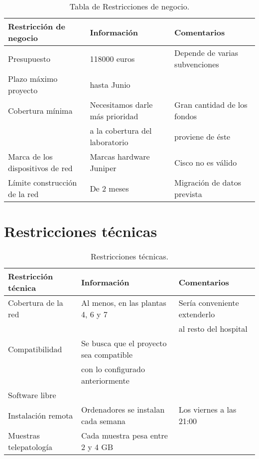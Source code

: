 \begin{table}[H]
	\begin{center}
		\begin{tabular}{|l|l|l|}
			\hline 
			Restricción de negocio & Información & Comentarios \\ 
			\hline \hline
			Presupuesto & 118000 euros & Depende de varias subvenciones \\ \hline
			Plazo máximo proyecto & hasta Junio & \\ \hline
			Cobertura mínima & Necesitamos darle más prioridad  & Gran cantidad de los fondos \\ 
			 & a la cobertura del laboratorio & proviene de éste  \\ \hline
			Marca de los dispositivos de red & Marcas hardware Juniper & Cisco no es válido\\ \hline
			Límite construcción de la red & De 2 meses & Migración de datos prevista \\ \hline
		\end{tabular}
		\caption{Tabla de Restricciones de negocio.}
		\label{tabla:tabla1}
	\end{center}
\end{table}

\section{Restricciones técnicas}

\begin{table}[H]
	\begin{center}
		\begin{tabular}{|l|l|l|}
			\hline 
			Restricción técnica & Información & Comentarios \\ 
			\hline \hline
			Cobertura de la red & Al menos, en las plantas 4, 6 y 7 & Sería conveniente extenderlo \\
			& & al resto del hospital \\ \hline
			Compatibilidad & Se busca que el proyecto sea compatible & \\ 
		    & con lo configurado anteriormente & \\ \hline
			Software libre &  & \\ \hline
			Instalación remota & Ordenadores se instalan cada semana & Los viernes a las 21:00 \\ \hline
			Muestras telepatología & Cada muestra pesa entre 2 y 4 GB & \\ \hline		
		\end{tabular}
		\caption{Restricciones técnicas.}
		\label{tabla:tabla2}
	\end{center}
\end{table}


